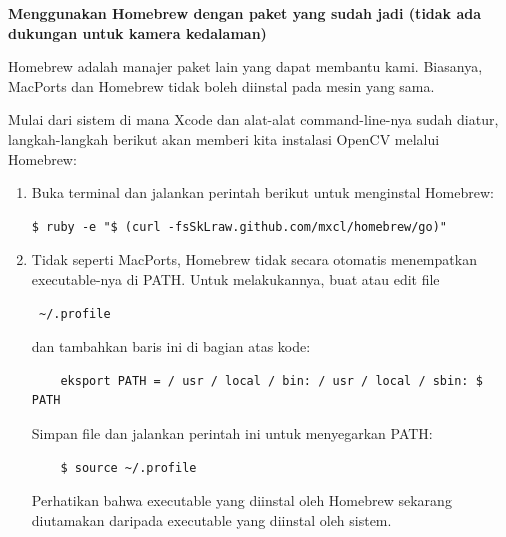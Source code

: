 \newpage
\textbf{Menggunakan Homebrew dengan paket yang sudah jadi (tidak ada dukungan untuk kamera kedalaman)}

Homebrew adalah manajer paket lain yang dapat membantu kami. Biasanya, MacPorts dan Homebrew tidak boleh diinstal pada mesin yang sama. 

Mulai dari sistem di mana Xcode dan alat-alat command-line-nya sudah diatur, langkah-langkah berikut akan memberi kita instalasi OpenCV melalui Homebrew:

\begin{enumerate}
	\item Buka terminal dan jalankan perintah berikut untuk menginstal Homebrew:
	\begin{verbatim}$ ruby ​​-e "$ (curl -fsSkLraw.github.com/mxcl/homebrew/go)" \end{verbatim} 
	\item Tidak seperti MacPorts, Homebrew tidak secara otomatis menempatkan executable-nya di PATH. Untuk melakukannya, buat atau edit file \begin{verbatim} ~/.profile \end{verbatim} dan tambahkan baris ini di bagian atas kode:
	\begin{verbatim} 
	eksport PATH = / usr / local / bin: / usr / local / sbin: $ PATH
	\end{verbatim}
	Simpan file dan jalankan perintah ini untuk menyegarkan PATH:
	\begin{verbatim} 
	$ source ~/.profile
	\end{verbatim}
	Perhatikan bahwa executable yang diinstal oleh Homebrew sekarang diutamakan daripada executable yang diinstal oleh sistem.


\end{enumerate}
